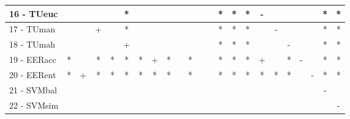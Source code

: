 \begin{table}[h]
\begin{center}
\begin{tabular}{lcc|cc|cc|cc|cc|cc|cc|cc|cc|cc|cc}
16 - TUeuc	&   &   &   &   & * &   &   &   &   &   &   &   & * & * & * & - &   &   &   &   & * & * \\ \hline
17 - TUman	&   &   & + &   & * &   &   &   &   &   &   &   & * & * & * &   & - &   &   &   & * & * \\
18 - TUmah	&   &   &   &   & + &   &   &   &   &   &   &   & * & * & * &   &   & - &   &   & * & * \\ \hline
19 - EERacc	& * &   & * & * & * & * & + & * &   & * &   &   & * & * & * & + &   & * & - &   & * & * \\
20 - EERent	& * & + & * & * & * & * & * & * &   & * &   &   & * & * & * & * & * & * &   & - & * & * \\ \hline
21 - SVMbal	&   &   &   &   &   &   &   &   &   &   &   &   &   &   &   &   &   &   &   &   & - &   \\
22 - SVMsim	&   &   &   &   &   &   &   &   &   &   &   &   &   &   &   &   &   &   &   &   &   & - \\ \hline\end{tabular}
\label{stratsfriedRFw}
\end{center}
\end{table}